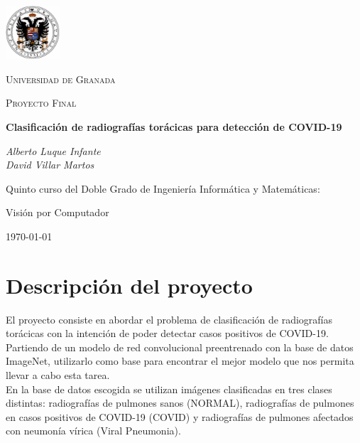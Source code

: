 \documentclass[11pt,a4paper]{article}
\theoremstyle{definition}
\begin{document}
\begin{titlepage}
  \centering
 \includegraphics[width=0.15\textwidth]{./images/exp.jpg}\par\vspace{1cm}
  {\scshape\LARGE Universidad de Granada  \par}
  \vspace{1cm}
  {\scshape Proyecto Final\par}
  \vspace{1.5cm}
  {\huge\bfseries  Clasificación de radiografías torácicas para detección de COVID-19\par}
  \vspace{2cm}
  {\Large\itshape Alberto Luque Infante\\David Villar Martos\par}
  \vfill
  Quinto curso del Doble Grado de Ingeniería Informática y Matemáticas:\par
  Visión por Computador

  \vfill

  {\large \today\par}
\end{titlepage}

\tableofcontents
\newpage
\section{Descripción del proyecto}

El proyecto consiste en abordar el problema de clasificación de radiografías torácicas con la intención de poder detectar casos positivos de COVID-19.\\

Partiendo de un modelo de red convolucional preentrenado con la base de datos ImageNet, utilizarlo como base para encontrar el mejor modelo que nos permita llevar a cabo esta tarea.\\

En la base de datos escogida se utilizan imágenes clasificadas en tres clases distintas: radiografías de pulmones sanos (NORMAL), radiografías de pulmones en casos positivos de COVID-19 (COVID) y radiografías de pulmones afectados con neumonía vírica (Viral Pneumonia).\\
\end{document}
